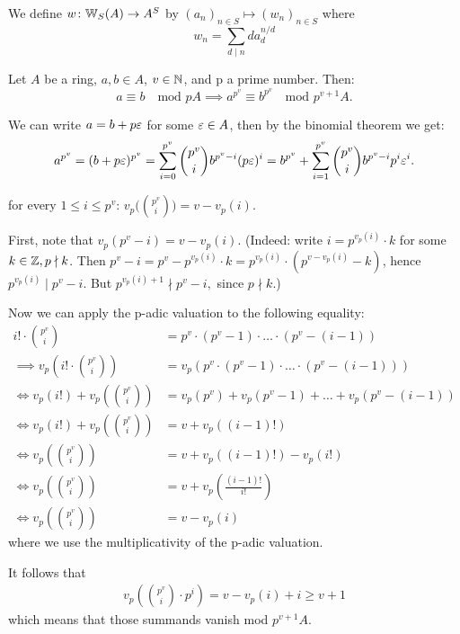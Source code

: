\begin{definition}
    We define $w \colon \mathbb{W}_S(A) \to A^S$
    by $(a_n)_{n \in S} \mapsto (w_n)_{n \in S}$ where 
    \[
        w_n = \sum_{d \mid n} d a_d^{n/d}
    \]
\end{definition}
\begin{lemma}\label{lem: congruences}
    Let $A$ be a ring, $a,b \in A$, $v \in \mathbb{N}$, and p a prime number. Then:
    \[
        a \equiv b \quad \text{mod } pA \implies a^{p^{v}} \equiv b^{p^{v}} \quad \text{mod } p^{v+1}A.
    \]
\end{lemma}
\begin{bigproof}
    We can write $a = b + p \varepsilon$ for some $\varepsilon \in A$,
    then by the binomial theorem we get:
    \[
        a^{p^{v}} = (b+p\varepsilon)^{p^v} = \sum_{i=0}^{p^v} \binom{p^v}{i}b^{p^v-i}(p\varepsilon)^{i}
        = b^{p^v} + \sum_{i=1}^{p^v} \binom{p^v}{i}b^{p^v-i}p^{i}\varepsilon^{i}.
    \]
    \begin{claim*}
    for every $1 \leq i \leq p^v$: $v_p\bigl(\binom{p^v}{i}\bigr) = v - v_p(i)$.
    \end{claim*}
    \begin{smallproof}
        First, note that $v_p(p^v-i) = v - v_p(i).$
        (Indeed: write $i = p^{v_p(i)} \cdot k$ for some $k \in \mathbb{Z}, p \nmid k$.
        Then $p^v-i = p^v-p^{v_p(i)}\cdot k = p^{v_p(i)}\cdot (p^{v-v_p(i)}-k)$,
        hence $p^{v_p(i)} \mid p^v-i$. But $p^{v_p(i)+1} \nmid p^v-i,$ since $p \nmid k$.)

        Now we can apply the p-adic valuation to the following equality:
        \begin{align*}
            i! \cdot \binom{p^v}{i} &= p^v \cdot (p^v-1) \cdot \ldots \cdot (p^v-(i-1)) \\
            \implies v_p \left( i! \cdot \binom{p^v}{i} \right) &= v_p(p^v \cdot (p^v-1) \cdot \ldots \cdot (p^v-(i-1))) \\
            \iff v_p(i!)+ v_p\left(\binom{p^v}{i}\right) &= v_p(p^v) + v_p(p^v-1) + \ldots + v_p(p^v-(i-1)) \\
            \iff v_p(i!)+ v_p\left(\binom{p^v}{i}\right) &= v + v_p((i-1)!) \\
            \iff v_p\left(\binom{p^v}{i}\right) &= v + v_p((i-1)!) - v_p(i!) \\
            \iff v_p\left(\binom{p^v}{i}\right) &= v + v_p\left(\frac{(i-1)!}{i!}\right) \\
            \iff v_p\left(\binom{p^v}{i}\right) &= v - v_p(i)
        \end{align*}
        where we use the multiplicativity of the p-adic valuation.
    \end{smallproof}
        It follows that 
        \begin{align*}
            v_p\left(\binom{p^v}{i} \cdot p^{i}\right) = v - v_p(i) + i \geq v+1
        \end{align*}
        which means that those summands vanish mod $p^{v+1}A$.
\end{bigproof}
